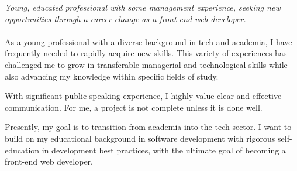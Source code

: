 
\vspace{-1.3em} %

\begin{multicols}{2}  %
\noindent \textit{Young, educated professional with some management experience, seeking new opportunities through a career change as a front-end web developer.}\\\\



As a young professional with a diverse background in tech and academia, I have frequently needed to rapidly acquire new skills. This variety of experiences has challenged me to grow in transferable managerial and technological skills while also advancing my knowledge within specific fields of study.


With significant public speaking experience, I highly value clear and effective communication. For me, a project is not complete unless it is done well.



Presently, my goal is to transition from academia into the tech sector. I want to build on my educational background in software development with rigorous self-education in development best practices, with the ultimate goal of becoming a front-end web developer.


\end{multicols}

